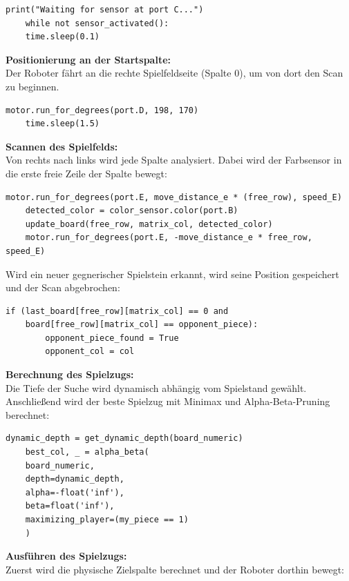 \begin{lstlisting}[style=pythonstyle]
	print("Waiting for sensor at port C...")
	while not sensor_activated():
	time.sleep(0.1)
\end{lstlisting}

\textbf{Positionierung an der Startspalte:}\\
Der Roboter fährt an die rechte Spielfeldseite (Spalte 0), um von dort den Scan zu beginnen.

\begin{lstlisting}[style=pythonstyle]
	motor.run_for_degrees(port.D, 198, 170)
	time.sleep(1.5)
\end{lstlisting}

\textbf{Scannen des Spielfelds:}\\
Von rechts nach links wird jede Spalte analysiert. Dabei wird der Farbsensor in die erste freie Zeile der Spalte bewegt:

\begin{lstlisting}[style=pythonstyle]
	motor.run_for_degrees(port.E, move_distance_e * (free_row), speed_E)
	detected_color = color_sensor.color(port.B)
	update_board(free_row, matrix_col, detected_color)
	motor.run_for_degrees(port.E, -move_distance_e * free_row, speed_E)
\end{lstlisting}

Wird ein neuer gegnerischer Spielstein erkannt, wird seine Position gespeichert und der Scan abgebrochen:

\begin{lstlisting}[style=pythonstyle]
	if (last_board[free_row][matrix_col] == 0 and
	board[free_row][matrix_col] == opponent_piece):
		opponent_piece_found = True
		opponent_col = col
\end{lstlisting}

\textbf{Berechnung des Spielzugs:}\\
Die Tiefe der Suche wird dynamisch abhängig vom Spielstand gewählt. Anschließend wird der beste Spielzug mit Minimax und Alpha-Beta-Pruning berechnet:

\begin{lstlisting}[style=pythonstyle]
	dynamic_depth = get_dynamic_depth(board_numeric)
	best_col, _ = alpha_beta(
	board_numeric,
	depth=dynamic_depth,
	alpha=-float('inf'),
	beta=float('inf'),
	maximizing_player=(my_piece == 1)
	)
\end{lstlisting}

\textbf{Ausführen des Spielzugs:}\\
Zuerst wird die physische Zielspalte berechnet und der Roboter dorthin bewegt:

